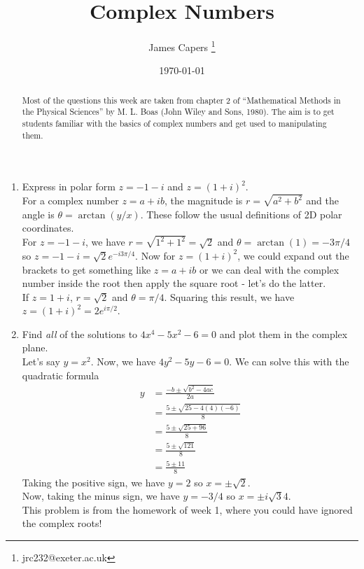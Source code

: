 \documentclass{article}
\title{Complex Numbers}
\author{James Capers \thanks{jrc232@exeter.ac.uk}}
\date{\today}
\begin{document}
\maketitle

\begin{abstract}
Most of the questions this week are taken from chapter 2 of ``Mathematical Methods in the Physical Sciences'' by M. L. Boas (John Wiley and Sons, 1980).
The aim is to get students familiar with the basics of complex numbers and get used to manipulating them.
\end{abstract}


\begin{enumerate}
	\item{Express in polar form $z=-1-i$ and $z = (1+i)^2$. \\
		For a complex number $z = a + i b$, the magnitude is $r = \sqrt{a^2 + b^2}$ and the angle is $\theta = \arctan(y/x)$.
		These follow the usual definitions of 2D polar coordinates.	\\
		For $z=-1-i$, we have $r = \sqrt{1^2 + 1^2} = \sqrt{2}$ and $\theta = \arctan (1) = -3\pi/4$ so $z=-1-i = \sqrt{2}e^{-i3\pi/4}$.
		Now for $z=(1+i)^2$, we could expand out the brackets to get something like $z=a+ib$ or we can deal with the complex number inside the root then apply the square root - let's do the latter. \\
		If $z = 1+i$, $r = \sqrt{2}$ and $\theta = \pi/4$.  Squaring this result, we have $z=(1+i)^2 = 2e^{i\pi/2}$.
	}
	\item{Find \emph{all} of the solutions to $4x^4 - 5x^2 -6 = 0$ and plot them in the complex plane. \\
		Let's say $y = x^2$.  Now, we have $4y^2 - 5y - 6 = 0$.  We can solve this with the quadratic formula 
		\begin{align*}
			y &= \frac{-b \pm \sqrt{b^2 - 4 ac}}{2a} \\
			&= \frac{5 \pm \sqrt{25-4(4)(-6)}}{8} \\
			&= \frac{5 \pm \sqrt{25+96}}{8} \\
			&= \frac{5 \pm \sqrt{121}}{8} \\
			&= \frac{5 \pm 11}{8}
		\end{align*}			
		Taking the positive sign, we have $y = 2$ so $x = \pm \sqrt{2}$. \\
		Now, taking the minus sign, we have $y = -3/4$ so $x = \pm i \sqrt{3}{4}$. \\
		This problem is from the homework of week 1, where you could have ignored the complex roots!
}
\end{enumerate}
\end{document}
